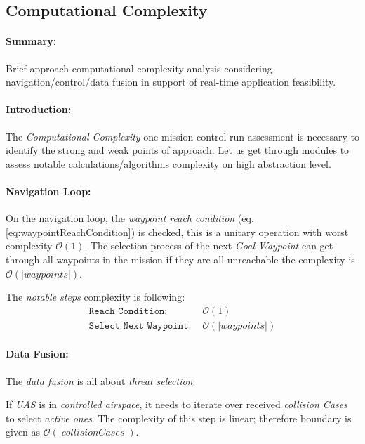 \newpage
\subsection{Computational Complexity}\label{sec:MCRcomputationalComplexity}

\paragraph{Summary:} Brief approach computational complexity analysis considering navigation/control/data fusion in support of real-time application feasibility.

\paragraph{Introduction:}The \emph{Computational Complexity} one mission control run assessment is necessary to identify the strong and weak points of approach. Let us get through modules to assess notable calculations/algorithms complexity on high abstraction level.

\paragraph{Navigation Loop:} On the navigation loop, the \emph{waypoint reach condition} (eq. \ref{eq:waypointReachCondition}) is checked, this is a unitary operation with worst complexity $\mathscr{O}(1)$. The selection process of the next \emph{Goal Waypoint} can get through all waypoints in the mission if they are all unreachable the complexity is $\mathscr{O}(|waypoints|)$.

The \emph{notable steps} complexity is following:
\begin{equation*}
    \begin{aligned}
        \texttt{Reach Condition: }& \mathscr{O}(1)\\
        \texttt{Select Next Waypoint: }&\mathscr{O}(|waypoints|)
    \end{aligned}
\end{equation*}

\paragraph{Data Fusion:} The \emph{data fusion} is all about \emph{threat selection}. 

If \emph{UAS} is in \emph{controlled airspace}, it needs to iterate over received \emph{collision Cases} to select \emph{active ones}. The complexity of this step is linear; therefore boundary is given as $\mathscr{O} (|collision Cases|)$.

